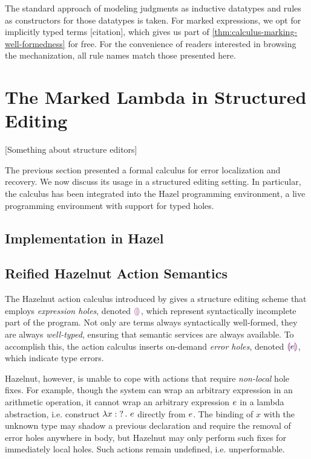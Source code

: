 The standard approach of modeling judgments as inductive datatypes and rules as constructors for
those datatypes is taken. For marked expressions, we opt for implicitly typed terms [citation],
which gives us part of \cref{thm:calculus-marking-well-formedness} for free. For the convenience of
readers interested in browsing the mechanization, all rule names match those presented here.

\section{The Marked Lambda in Structured Editing}
\label{sec:calculus-structured-editing}

[Something about structure editors]

The previous section presented a formal calculus for error localization and recovery. We now discuss
its usage in a structured editing setting. In particular, the calculus has been integrated into the
Hazel programming environment, a live programming environment with support for typed holes.

\subsection{Implementation in Hazel}
\label{sec:calculus-hazel}

\subsection{Reified Hazelnut Action Semantics}
\label{sec:calculus-hazelnut}

The Hazelnut action calculus introduced by \citet{HazelnutPOPL} gives a structure editing scheme
that employs \emph{expression holes}, denoted $\EEHole$, which represent syntactically incomplete
part of the program. Not only are terms always syntactically well-formed, they are always
\emph{well-typed}, ensuring that semantic services are always available. To accomplish this, the
action calculus inserts on-demand \emph{error holes}, denoted $\textcolor{violet}{\llparenthesis} e \textcolor{violet}{\rrparenthesis}$, which indicate type
errors.


Hazelnut, however, is unable to cope with actions that require \emph{non-local} hole fixes. For
example, though the system can wrap an arbitrary expression in an arithmetic operation, it cannot
wrap an arbitrary expression $e$ in a lambda abstraction, i.e. construct
$\lambda x : \operatorname{?}. ~e$ directly from $e$. The binding of $x$ with the unknown type may
shadow a previous declaration and require the removal of error holes anywhere in body, but Hazelnut
may only perform such fixes for immediately local holes. Such actions remain undefined, i.e.
unperformable.

